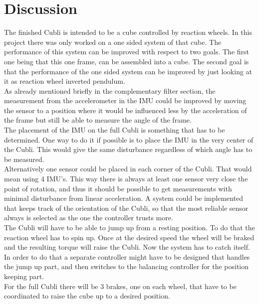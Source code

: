 \chapter{Discussion}
The finished Cubli is intended to be a cube controlled by reaction wheels. In this project there was only worked on a one sided system of that cube. The performance of this system can be improved with respect to two goals. The first one being that this one frame, can be assembled into a cube.
The second goal is that the performance of the one sided system can be improved by just looking at it as reaction wheel inverted pendulum.
\\
As already mentioned briefly in the complementary filter section, the measurement from the accelerometer in the IMU could be improved by moving the sensor to a position where it would be influenced less by the acceleration of the frame but still be able to measure the angle of the frame. \\
The placement of the IMU on the full Cubli is something that has to be determined. One way to do it if possible is to place the IMU in the very center of the Cubli. This would give the same disturbance regardless of which angle has to be measured.\\
Alternatively one sensor could be placed in each corner of the Cubli. That would mean using 4 IMU's. This way there is always at least one sensor very close the point of rotation, and thus it should be possible to get measurements with minimal disturbance from linear acceleration. A system could be implemented that keeps track of the orientation of the Cubli, so that the most reliable sensor always is selected as the one the controller trusts more.\\
The Cubli will have to be able to jump up from a resting position. To do that the reaction wheel has to spin up. Once at the desired speed the wheel will be braked and the resulting torque will raise the Cubli. Now the system has to catch itself. In order to do that a separate controller might have to be designed that handles the jump up part, and then switches to the balancing controller for the position keeping part.\\
For the full Cubli there will be 3 brakes, one on each wheel, that have to be coordinated to raise the cube up to a desired position.\\
